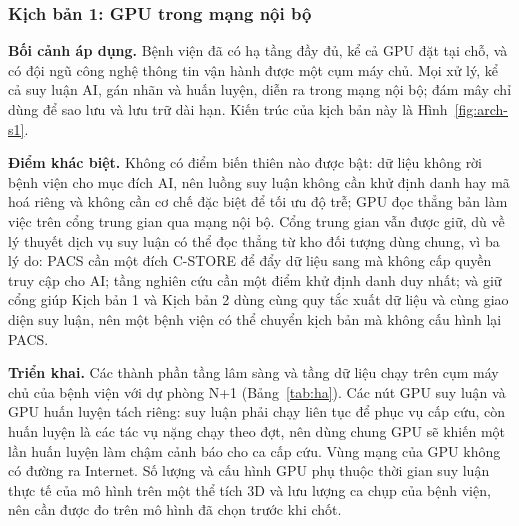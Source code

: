 \subsubsection{Kịch bản 1: GPU trong mạng nội bộ}
\label{sec:scenario1}

\textbf{Bối cảnh áp dụng.} Bệnh viện đã có hạ tầng đầy đủ, kể cả GPU đặt tại chỗ, và
có đội ngũ công nghệ thông tin vận hành được một cụm máy chủ. Mọi xử lý, kể cả suy luận
AI, gán nhãn và huấn luyện, diễn ra trong mạng nội bộ; đám mây chỉ dùng để sao lưu và
lưu trữ dài hạn. Kiến trúc của kịch bản này là Hình~\ref{fig:arch-s1}.

\textbf{Điểm khác biệt.} Không có điểm biến thiên nào được bật: dữ liệu không rời
bệnh viện cho mục đích AI, nên luồng suy luận không cần khử định danh hay mã hoá riêng
và không cần cơ chế đặc biệt để tối ưu độ trễ; GPU đọc thẳng bản làm việc trên cổng
trung gian qua mạng nội bộ. Cổng trung gian vẫn được giữ, dù về lý thuyết dịch vụ suy
luận có thể đọc thẳng từ kho đối tượng dùng chung, vì ba lý do: PACS cần một đích
C-STORE để đẩy dữ liệu sang mà không cấp quyền truy cập cho AI; tầng nghiên cứu cần một
điểm khử định danh duy nhất; và giữ cổng giúp Kịch bản 1 và Kịch bản 2 dùng cùng quy tắc
xuất dữ liệu và cùng giao diện suy luận, nên một bệnh viện có thể chuyển kịch bản mà
không cấu hình lại PACS.

\textbf{Triển khai.} Các thành phần tầng lâm sàng và tầng dữ liệu chạy trên cụm máy chủ
của bệnh viện với dự phòng N+1 (Bảng~\ref{tab:ha}). Các nút GPU suy luận và GPU huấn luyện
tách riêng: suy luận phải chạy liên tục để phục vụ cấp cứu, còn huấn luyện là các tác vụ
nặng chạy theo đợt, nên dùng chung GPU sẽ khiến một lần huấn luyện làm chậm cảnh báo cho
ca cấp cứu. Vùng mạng của GPU không có đường ra Internet. Số lượng và cấu hình GPU phụ
thuộc thời gian suy luận thực tế của mô hình trên một thể tích 3D và lưu lượng ca chụp
của bệnh viện, nên cần được đo trên mô hình đã chọn trước khi chốt.

